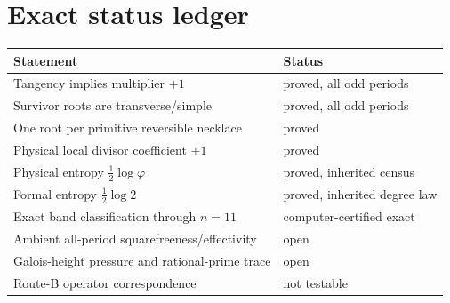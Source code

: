 \section{Exact status ledger}

\begin{center}
\begin{tabular}{p{}p{}}
\toprule
Statement & Status\\
\midrule
Tangency implies multiplier $+1$ & proved, all odd periods\\
Survivor roots are transverse/simple & proved, all odd periods\\
One root per primitive reversible necklace & proved\\
Physical local divisor coefficient $+1$ & proved\\
Physical entropy $\frac12\log\varphi$ & proved, inherited census\\
Formal entropy $\frac12\log2$ & proved, inherited degree law\\
Exact band classification through $n=11$ & computer-certified exact\\
Ambient all-period squarefreeness/effectivity & open\\
Galois-height pressure and rational-prime trace & open\\
Route-B operator correspondence & not testable\\
\bottomrule
\end{tabular}
\end{center}

